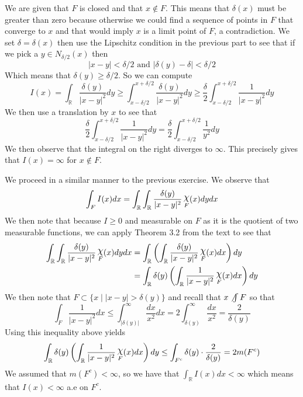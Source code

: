 \documentclass{article}
\DeclareMathOperator{\R}{\mathbb{R}}
\DeclareMathOperator{\capchi}{\raisebox{2pt}{$\mathlarger{\mathlarger{\chi}}$}}
\DeclareMathOperator{\suchthat}{\mathrel{|}}
\newcommand{\problempart}[1]{\noindent{\textbf{(#1)}}}
\begin{document}
\problempart{b} We are given that $F$ is closed and that $x \not\in F$. This means that $\delta(x)$ must be greater than zero because otherwise we could find a sequence of points in $F$ that converge to $x$ and that would imply $x$ is a limit point of $F$, a contradiction. We set $\delta = \delta(x)$ then use the Lipschitz condition in the previous part to see that if we pick a $y \in N_{\delta/2}(x)$ then 
\[
|x - y| < \delta/2 \text{ and } |\delta(y) - \delta| < \delta/2
\] 
Which means that $\delta(y) \geq \delta/2$. So we can compute
\[
I(x) = \int_{\R} \frac{\delta(y)}{|x-y|^2}dy \geq \int_{x - \delta/2}^{x + \delta/2} \frac{\delta(y)}{|x - y|^2}dy \geq \frac{\delta}{2}\int_{x - \delta/2}^{x + \delta/2} \frac{1}{|x - y|^2}dy
\]
We then use a translation by $x$ to see that
\[
\frac{\delta}{2}\int_{x - \delta/2}^{x + \delta/2} \frac{1}{|x - y|^2}dy = \frac{\delta}{2}\int_{x - \delta/2}^{x + \delta/2} \frac{1}{y^2}dy
\]
We then observe that the integral on the right diverges to $\infty$. This precisely gives that $I(x) = \infty$ for $x \not\in F$.

\problempart{c} We proceed in a similar manner to the previous exercise. We observe that
\[
\int_F I(x)dx = \int_{\R}\int_{\R} \frac{\delta(y)}{|x-y|^2} \capchi_F(x) dydx
\]
We then note that because $I \geq 0$ and measurable on $F$ as it is the quotient of two measurable functions, we can apply Theorem 3.2 from the text to see that
\begin{align*}
 \int_{\R}\int_{\R} \frac{\delta(y)}{|x-y|^2} \capchi_F(x) dydx &=  \int_{\R}\left(\int_{\R} \frac{\delta(y)}{|x-y|^2} \capchi_F(x) dx\right)dy \\
 &=  \int_{\R}\delta(y)\left(\int_{\R} \frac{1}{|x-y|^2} \capchi_F(x) dx\right)dy
\end{align*}
We then note that $F \subset \{x \suchthat |x - y| > \delta(y)\}$ and recall that $x \not\int F$ so that
\[
\int_F \frac{1}{|x-y|^2}dx \leq \int_{|\delta(y)|}^\infty \frac{dx}{x^2}dx = 2\int_{\delta(y)}^\infty \frac{dx}{x^2} = \frac{2}{\delta(y)}
\]
Using this inequality above yields
\[
\int_{\R}\delta(y)\left(\int_{\R} \frac{1}{|x-y|^2} \capchi_F(x) dx\right)dy \leq \int_{F^c}\delta(y) \cdot \frac{2}{\delta(y)} = 2m(F^c)
\]
We assumed that $m(F^c) < \infty$, so we have that $\int_{\R} I(x)dx < \infty$ which means that $I(x) < \infty$ a.e on $F^c$. 
\end{document}
